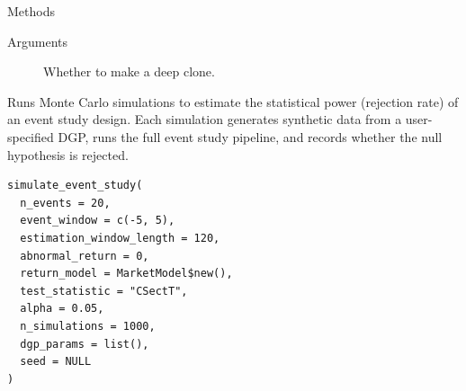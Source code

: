 \documentclass[a4paper]{book}
\begin{document}
\begin{Section}{Methods}
\begin{SubSection}{}

%
\begin{SubSubSection}{Arguments}

\begin{description}

\item[] Whether to make a deep clone.

\end{description}



\end{SubSubSection}

\end{SubSection}


\end{Section}
%
\begin{Description}
Runs Monte Carlo simulations to estimate the statistical power (rejection
rate) of an event study design. Each simulation generates synthetic data
from a user-specified DGP, runs the full event study pipeline, and records
whether the null hypothesis is rejected.
\end{Description}
%
\begin{Usage}
\begin{verbatim}
simulate_event_study(
  n_events = 20,
  event_window = c(-5, 5),
  estimation_window_length = 120,
  abnormal_return = 0,
  return_model = MarketModel$new(),
  test_statistic = "CSectT",
  alpha = 0.05,
  n_simulations = 1000,
  dgp_params = list(),
  seed = NULL
)
\end{verbatim}
\end{Usage}
%
\end{document}
